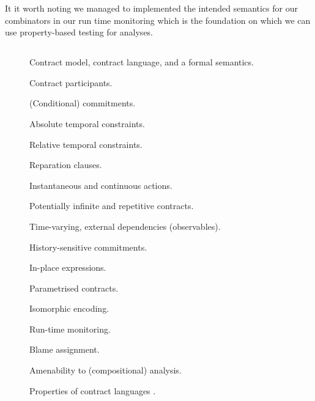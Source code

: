 \documentclass{ituthesis}
\begin{document}
It it worth noting we managed to implemented the intended semantics for our combinators in our run time monitoring which is the foundation on which we can use property-based testing for analyses.

\begin{appendices}

\chapter{}

\begin{figure}[!h]
\begin{tcolorbox}[fontupper=\small]
\begin{list}{R:~}{}
    \item Contract model, contract language, and a formal semantics.
    \item Contract participants.
    \item (Conditional) commitments.
    \item Absolute temporal constraints.
    \item Relative temporal constraints.
    \item Reparation clauses.
    \item Instantaneous and continuous actions.
    \item Potentially infinite and repetitive contracts.
    \item Time-varying, external dependencies (observables).
    \item History-sensitive commitments.
    \item In-place expressions.
    \item Parametrised contracts.
    \item Isomorphic encoding.
    \item Run-time monitoring.
    \item Blame assignment.
    \item Amenability to (compositional) analysis.
\end{list}
\end{tcolorbox}
\caption{Properties of contract languages \cite{hvitved2011contract}.}
\label{fig:properties}
\end{figure}

\end{appendices}



\printbibliography
\end{document}
